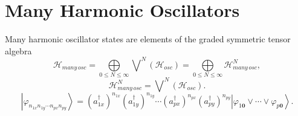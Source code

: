 \documentclass[aps,preprint]{revtex4}%
\begin{document}
\section{Many Harmonic Oscillators}

Many harmonic oscillator states are elements of the graded symmetric tensor
algebra
\begin{equation}
\mathcal{H}_{many\,osc}=\bigoplus\limits_{0\leq N\leq\infty}\bigvee
\nolimits^{N}\left(  \mathcal{H}_{osc}\right)  =\bigoplus\limits_{0\leq
N\leq\infty}\mathcal{H}_{many\,osc}^{N},
\end{equation}%
\begin{equation}
\mathcal{H}_{many\,osc}^{N}=\bigvee\nolimits^{N}\left(  \mathcal{H}%
_{osc}\right)  .
\end{equation}%
\begin{equation}
\left\vert \varphi_{n_{1x}n_{1y}\cdots n_{px}n_{py}}\right\rangle =\left(
a_{1x}^{\dagger}\right)  ^{n_{1x}}\left(  a_{1y}^{\dagger}\right)  ^{n_{1y}%
}\cdots\left(  a_{px}^{\dagger}\right)  ^{n_{px}}\left(  a_{py}^{\dagger
}\right)  ^{n_{py}}\left\vert \varphi_{1\mathbf{0}}\vee\cdots\vee
\varphi_{p\mathbf{0}}\right\rangle .
\end{equation}%
\begin{equation}
\end{equation}
\end{document}
